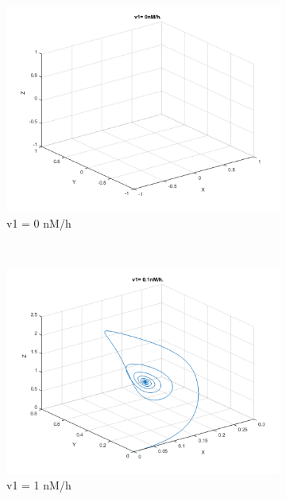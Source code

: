 \documentclass[10pt,a4paper,oneside,twocolumn]{article}
\numberwithin{equation}{section} %
\begin{document}
    \begin{figure}
    \centering
	\begin{subfigure}[b]{0.32\textwidth}
	    \includegraphics[width=\textwidth]{LotsofthesameA/A-AA0.png}
	    \caption{v1 = 0 nM/h}
	\end{subfigure}
	~ 
	\begin{subfigure}[b]{0.32\textwidth}
	    \includegraphics[width=\textwidth]{LotsofthesameA/A-AA1.png}
	    \caption{v1 = 1 nM/h}
	\end{subfigure}
	~ 
	\begin{subfigure}[b]{0.32\textwidth}

\end{subfigure}
\end{figure}
\end{document}
